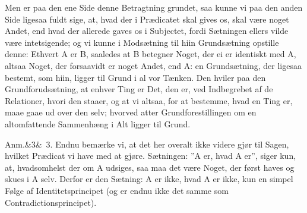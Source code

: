 \documentclass[12pt]{book}
\def\sperr#1{#1}%
\def\textit#1{#1}%
\newcommand{\sperr}[1]{\textls[180]{#1}}
\newcommand{\anm}[1]{%
  \par\vspace{0.5\baselineskip}%
  \noindent\hspace{\parindent}\sperr{Anm.}\ifx&#1&\else~\textit{#1}.\fi
  \enspace\ignorespaces
}
\newcommand{\opage}[1]{\marginnote{\footnotesize\textit{[#1]}}}
\begin{document}
Men er paa den ene Side denne Betragtning grundet, saa kunne vi paa den anden
Side ligesaa fuldt sige, at, hvad der i Prædicatet skal gives os,
\opage{314} skal være noget Andet, end hvad der allerede gaves os i Subjectet, fordi
Sætningen ellers vilde være intetsigende; og vi kunne i Modsætning til hiin
Grundsætning opstille denne: Ethvert \textit{A} er \textit{B}, saaledes at
\textit{B} betegner Noget, der ei er identiskt med \textit{A}, altsaa Noget,
der forsaavidt er noget Andet, end \textit{A}: en Grundsætning, der ligesaa
bestemt, som hiin, ligger til Grund i al vor Tænken. Den hviler paa den
Grundforudsætning, at enhver Ting er Det, den er, ved Indbegrebet af de
Relationer, hvori den staaer, og at vi altsaa, for at bestemme, hvad en Ting
er, maae gaae ud over den selv; hvorved atter Grundforestillingen om en
altomfattende Sammenhæng i Alt ligger til Grund.

\anm{3} Endnu bemærke vi, at det her overalt ikke videre gjør til Sagen, hvilket
Prædicat vi have med at gjøre. Sætningen: ''\textit{A} er, hvad \textit{A}
er'', siger kun, at, hvadsomhelst der om \textit{A} udsiges, saa maa det være
Noget, der først haves og skues i \textit{A} selv. Derfor er den Sætning:
\textit{A} er ikke, hvad \textit{A} er ikke, kun en simpel Følge af
Identitetsprincipet (og er endnu ikke det samme som Contradictionsprincipet).
\end{document}
